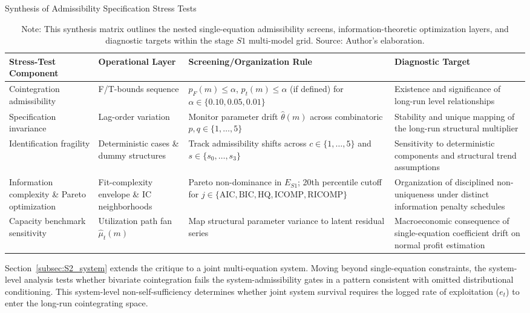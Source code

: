 \documentclass[11pt]{article}
\begin{document}
\begin{table}[h!]
\centering
\small
\caption{Synthesis of Admissibility Specification Stress Tests}
\label{tab:s1_stress_synthesis}
\begin{tabular}{@{}>{\raggedright\arraybackslash}p{3.2cm}>{\raggedright\arraybackslash}p{2.6cm}>{\raggedright\arraybackslash}p{3.8cm}>{\raggedright\arraybackslash}p{4.0cm}@{}}
\toprule
Stress-Test Component & Operational Layer & Screening/Organization Rule & Diagnostic Target \\
\midrule
\midrule
Cointegration admissibility & F/T-bounds sequence & $p_F(m) \leq \alpha$, $p_t(m) \leq \alpha$ (if defined) for $\alpha \in \{0.10, 0.05, 0.01\}$ & Existence and significance of long-run level relationships \\
Specification invariance & Lag-order variation & Monitor parameter drift $\hat{\theta}(m)$ across combinatoric $p,q \in \{1,\dots,5\}$ & Stability and unique mapping of the long-run structural multiplier \\
Identification fragility & Deterministic cases \& dummy structures & Track admissibility shifts across $c \in \{1,\dots,5\}$ and $s \in \{s_0,\dots,s_3\}$ & Sensitivity to deterministic components and structural trend assumptions \\
Information complexity \& Pareto optimization & Fit-complexity envelope \& IC neighborhoods & Pareto non-dominance in $E_{S1}$; 20th percentile cutoff for $j \in \{\text{AIC}, \text{BIC}, \text{HQ}, \text{ICOMP}, \text{RICOMP}\}$ & Organization of disciplined non-uniqueness under distinct information penalty schedules \\
Capacity benchmark sensitivity & Utilization path fan $\hat{\mu}_t(m)$ & Map structural parameter variance to latent residual series & Macroeconomic consequence of single-equation coefficient drift on normal profit estimation \\
\bottomrule
\end{tabular}
\caption*{Note: This synthesis matrix outlines the nested single-equation admissibility screens, information-theoretic optimization layers, and diagnostic targets within the stage $S1$ multi-model grid. Source: Author's elaboration.}
\end{table}

Section~\ref{subsec:S2_system} extends the critique to a joint multi-equation system. Moving beyond single-equation constraints, the system-level analysis tests whether bivariate cointegration fails the system-admissibility gates in a pattern consistent with omitted distributional conditioning. This system-level non-self-sufficiency determines whether joint system survival requires the logged rate of exploitation ($e_t$) to enter the long-run cointegrating space.
\end{document}
